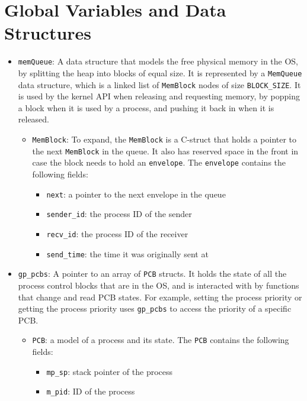 \documentclass[12pt]{report}
\begin{document}
\section{Global Variables and Data Structures}
\begin{itemize}
  \item \texttt{memQueue}: A data structure that models the free physical memory in the OS, by splitting the heap into blocks of equal size. It is represented by a \texttt{MemQueue} data structure, which is a linked list of \texttt{MemBlock} nodes of size \texttt{BLOCK_SIZE}. It is used by the kernel API when releasing and requesting memory, by popping a block when it is used by a process, and pushing it back in when it is released.
    \begin{itemize}
      \item \texttt{MemBlock}: To expand, the \texttt{MemBlock} is a C-struct that holds a pointer to the next \texttt{MemBlock} in the queue. It also has reserved space in the front in case the block needs to hold an \texttt{envelope}. The \texttt{envelope} contains the following fields:
        \begin{itemize}
          \item \texttt{next}: a pointer to the next envelope in the queue
          \item \texttt{sender_id}: the process ID of the sender
          \item \texttt{recv_id}: the process ID of the receiver
          \item \texttt{send_time}: the time it was originally sent at
        \end{itemize}
    \end{itemize}
  \item \texttt{gp_pcbs}: A pointer to an array of \texttt{PCB} structs. It holds the state of all the process control blocks that are in the OS, and is interacted with by functions that change and read PCB states. For example, setting the process priority or getting the process priority uses \texttt{gp_pcbs} to access the priority of a specific PCB.
    \begin{itemize}
      \item \texttt{PCB}: a model of a process and its state. The \texttt{PCB} contains the following fields:
        \begin{itemize}
          \item \texttt{mp_sp}: stack pointer of the process
          \item \texttt{m_pid}: ID of the process

\end{itemize}
\end{itemize}
\end{itemize}
\end{document}
